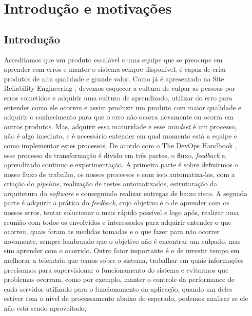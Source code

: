 \part{Introdução e motivações}
  \chapter{Introdução}
    Acreditamos que um produto escalável e uma equipe que se preocupe em aprender
    com erros e manter o sistema sempre disponível, é capaz de criar produtos de
    alta qualidade e grande valor. \newline
    Como já é apresentado na Site Reliability Engineering \cite{SiteReliabilityEngineering},
    devemos esquecer a cultura de culpar as pessoas por erros cometidos e adquirir
    uma cultura de aprendizado, utilizar do erro para entender como ele ocorreu e
    assim produzir um produto com maior qualidade e adquirir o conhecimento para
    que o erro não ocorra novamente ou ocorra em outros produtos. Mas, adquirir essa
    maturidade e esse \textit{mindset} é um processo, não é algo imediato, e é
    necessário entender em qual momento está a equipe e como implementar estes
    processos. \newline
    De acordo com o The DevOps Handbook \cite{TheDevOpsHandbook}, esse processo de
    transformação é divido em três partes, o fluxo, \textit{feedback} e, aprendizado
    continuo e experimentação. A primeira parte é sobre definirmos o nosso fluxo de
    trabalho, os nossos processos e com isso automatiza-los, com a criação do
    \textit{pipeline}, realização de testes automatizados, estruturação da arquitetura
    do \textit{software} e conseguindo realizar entregas de baixo risco. A segunda
    parte é adquirir a prática do \textit{feedback}, cujo objetivo é o de aprender
    com os nossos erros, tentar solucionar o mais rápido possível e logo após, realizar
    uma reunião com todos os envolvidos e interessados para adquirir entender o que
    ocorreu, quais foram as medidas tomadas e o que fazer para não ocorrer novamente,
    sempre lembrando que o objetivo não é encontrar um culpado, mas sim aprender com
    o ocorrido. Outro fator importante é o de investir tempo em melhorar a telemtria
    que temos sobre o sistema, trabalhar em quais informações precisamos para
    supervisionar o funcionamento do sistema e evitarmos que problemas ocorram,
    como por exemplo, manter o controle da performance de cada servidor utilizado
    para o funcionamento da aplicação, quando um deles estiver com o nível de
    processamento abaixo do esperado, podemos analisar se ele não está sendo aproveitado,
